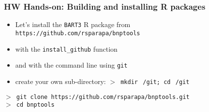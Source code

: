 \documentclass[11pt,pdftex,dvipsnames,usenames,helvetica]{beamer}
\begin{document}
\begin{frame}[fragile]
\frametitle{HW Hands-on: Building and installing R packages}
\begin{itemize}
\item Let's install the {\tt BART3} R package 
from {\tt https://github.com/rsparapa/bnptools} 
\item  with the {\tt install\_github} function
\item and with the command line using {\tt git}
\item create your own sub-directory: {\tt $>$ mkdir $~$/git; cd $~$/git}
\end{itemize}
{\tt $>$ git clone~https://github.com/rsparapa/bnptools.git}\\
{\tt $>$ cd bnptools}

\end{frame}
\end{document}
